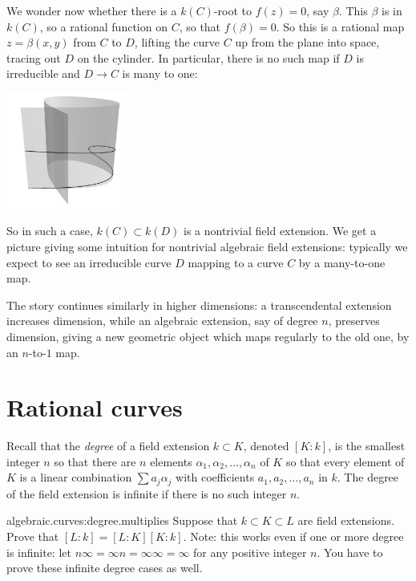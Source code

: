 We wonder now whether there is a \(k(C)\)-root to \(f(z)=0\), say \(\beta\).
This \(\beta\) is in \(k(C)\), so a rational function on \(C\), so that \(f(\beta)=0\).
So this is a rational map \(z=\beta(x,y)\) from \(C\) to \(D\), lifting the curve \(C\) up from the plane into space, tracing out \(D\) on the cylinder.
In particular, there is no such map if \(D\) is irreducible and \(D \to C\) is many to one:
\begin{center}
\includegraphics[width=4cm]{cylinder-on-curve-3}
\end{center}
So in such a case, \(k(C) \subset k(D)\) is a nontrivial field extension.
We get a picture giving some intuition for nontrivial algebraic field extensions: typically we expect to see an irreducible curve \(D\) mapping to a curve \(C\) by a many-to-one map.

The story continues similarly in higher dimensions: a transcendental extension increases dimension, while an algebraic extension, say of degree \(n\), preserves dimension, giving a new geometric object which maps regularly to the old one, by an \(n\)-to-\(1\) map.

   
\section{Rational curves}

Recall that the \emph{degree} of a field extension \(k \subset K\), denoted \([K:k]\), is the smallest integer \(n\) so that there are \(n\) elements \(\alpha_1, \alpha_2, \dots, \alpha_n\) of \(K\) so that every element of \(K\) is a linear combination \(\sum a_j \alpha_j\) with coefficients \(a_1, a_2, \dots, a_n\) in \(k\).
The degree of the field extension is infinite if there is no such integer \(n\).

\begin{problem}{algebraic.curves:degree.multiplies}
Suppose that \(k \subset K \subset L\) are field extensions.
Prove that \([L:k]=[L:K][K:k]\).
Note: this works even if one or more degree is infinite: let \(n\infty=\infty n = \infty \infty = \infty\) for any positive integer \(n\).
You have to prove these infinite degree cases as well.
\end{problem}

